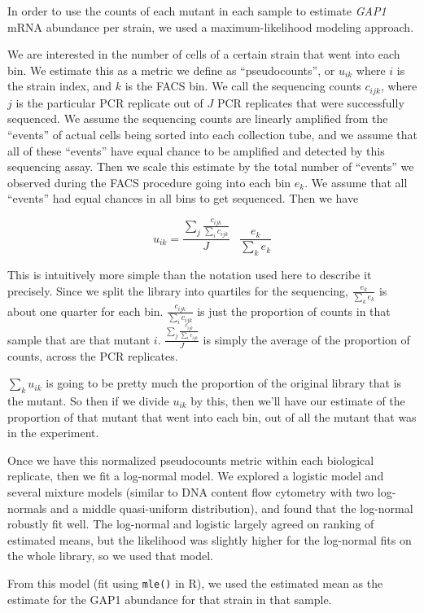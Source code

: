 In order to use the counts of each mutant in each sample to estimate
\emph{GAP1} mRNA abundance per strain, we used a maximum-likelihood
modeling approach.

We are interested in the number of cells of a certain strain that went
into each bin. We estimate this as a metric we define as
``pseudocounts'', or \(u_{ik}\) where \(i\) is the strain index, and
\(k\) is the FACS bin. We call the sequencing counts \(c_{ijk}\), where
\(j\) is the particular PCR replicate out of \(J\) PCR replicates that
were successfully sequenced. We assume the sequencing counts are
linearly amplified from the ``events'' of actual cells being sorted into
each collection tube, and we assume that all of these ``events'' have
equal chance to be amplified and detected by this sequencing assay. Then
we scale this estimate by the total number of ``events'' we observed
during the FACS procedure going into each bin \(e_k\). We assume that
all ``events'' had equal chances in all bins to get sequenced. Then we
have

\[ u_{ik} = 
  \frac{ \sum_j \frac{c_{ijk}}{\sum_i c_{ijk}} }{J}
  \;\;\; \frac{ e_{k}}{\sum_{k} e_{k}} \]

This is intuitively more simple than the notation used here to describe
it precisely. Since we split the library into quartiles for the
sequencing, \(\frac{ e_{k}}{\sum_{k} e_{k}}\) is about one quarter for
each bin. \(\frac{ c_{ijk}}{\sum_{i} c_{ijk}}\) is just the proportion
of counts in that sample that are that mutant \(i\).
\(\frac{ \sum_j \frac{c_{ijk}}{\sum_i c_{ijk}} }{J}\) is simply the
average of the proportion of counts, across the PCR replicates.

\(\sum_k u_{ik}\) is going to be pretty much the proportion of the
original library that is the mutant. So then if we divide \(u_{ik}\) by
this, then we'll have our estimate of the proportion of that mutant that
went into each bin, out of all the mutant that was in the experiment.

Once we have this normalized pseudocounts metric within each biological
replicate, then we fit a log-normal model. We explored a logistic model
and several mixture models (similar to DNA content flow cytometry with
two log-normals and a middle quasi-uniform distribution), and found that
the log-normal robustly fit well. The log-normal and logistic largely
agreed on ranking of estimated means, but the likelihood was slightly
higher for the log-normal fits on the whole library, so we used that
model.

From this model (fit using \texttt{mle()} in R), we used the estimated
mean as the estimate for the GAP1 abundance for that strain in that
sample.

